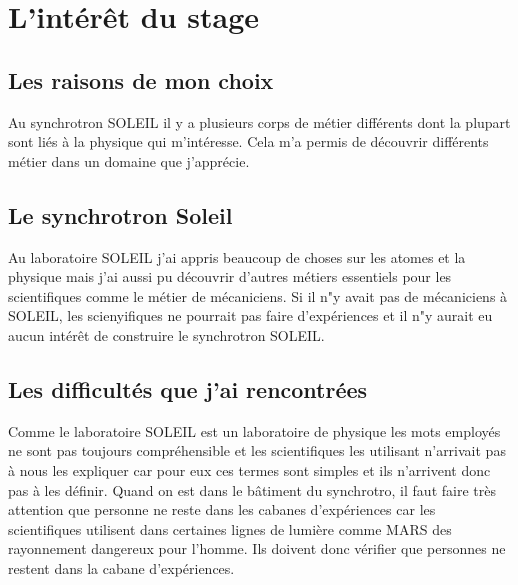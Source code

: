 \chapter{L'intérêt du stage}
	
	\minitoc
	





\section{Les raisons de mon choix}
    Au synchrotron SOLEIL il y a plusieurs corps de métier différents dont la plupart sont liés à la physique qui m'intéresse. Cela m'a permis de découvrir différents métier dans un domaine que j'apprécie.
	
\section{Le synchrotron Soleil}
    Au laboratoire SOLEIL j'ai appris beaucoup de choses sur les atomes et la physique mais j'ai aussi pu découvrir d'autres métiers essentiels pour les scientifiques comme le métier de mécaniciens. Si il n"y avait pas de mécaniciens à SOLEIL, les scienyifiques ne pourrait pas faire d'expériences et il n"y aurait eu aucun intérêt de construire le synchrotron SOLEIL.

\section{Les difficultés que j'ai rencontrées}
    Comme le laboratoire SOLEIL est un laboratoire de physique les mots employés ne sont pas toujours compréhensible et les scientifiques les utilisant n'arrivait pas à nous les expliquer car pour eux ces termes sont simples et ils n'arrivent donc pas à les définir. 
    Quand on est dans le bâtiment du synchrotro, il faut faire très attention que personne ne reste dans les cabanes d'expériences car les scientifiques utilisent dans certaines lignes de lumière comme MARS des rayonnement dangereux pour l'homme. Ils doivent donc vérifier que personnes ne restent dans la cabane d'expériences.


